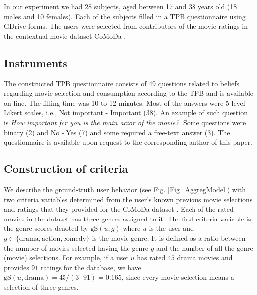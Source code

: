 \documentclass{llncs}
\def\gS{{\mbox{gS}}}
\begin{document}
In our experiment we had 28 subjects, aged between 17 and 38 years old (18 males and 10 females). Each of the subjects filled in a TPB questionnaire using GDrive forms. The users were selected from contributors of the movie ratings in the contextual movie dataset CoMoDa  \cite{CoMoDa2009}.


\subsection{Instruments}\label{SubSec_Instrum}

The constructed TPB questionnaire consists of 49 questions related to beliefs regarding movie selection and consumption according to the TPB and is available on-line. The filling time was 10 to 12 minutes. Most of the answers were 5-level Likert scales, i.e., Not important - Important (38). An example of such question is {\it How important for you is the main actor of the movie?}. Some questions were binary (2) and No - Yes (7) and some required a free-text answer (3). The questionnaire is available upon request to the corresponding author of this paper. 


\subsection{Construction of criteria}\label{SubSec_CritConstr}

We describe the ground-truth user behavior (see Fig. \ref{Fig_AggregModel}) with two criteria variables determined from the user’s known previous movie selections and ratings that they provided for the CoMoDa dataset \cite{CoMoDa2009}. Each of the rated movies in the dataset has three genres assigned to it. The first criteria variable is the genre scores denoted by $\gS(u, g)$ where $u$ is the user and $g\in\{\mbox{drama}, \mbox{action}, \mbox{comedy}\}$ is the movie genre. It is defined as a ratio between the number of movies selected having the genre $g$ and the number of all the genre (movie) selections. For example, if a user $u$ has rated $45$ drama movies and provides $91$ ratings for the database, we have $\gS(u, \mbox{drama}) = 45/(3\cdot91)=0.165$, since every movie selection means a selection of three genres. 
\end{document}
